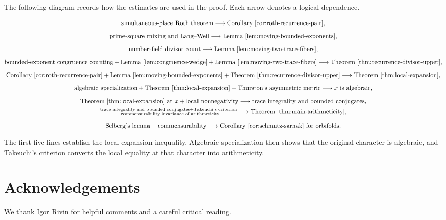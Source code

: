 \documentclass[11pt,reqno]{amsart}
\theoremstyle{definition}
\theoremstyle{remark}
\begin{document}
The following diagram records how the estimates are used in the proof.
Each arrow denotes a logical dependence.
\begin{small}
\[
\begin{gathered}
 \text{simultaneous-place Roth theorem}
 \longrightarrow
 \text{Corollary~\ref{cor:roth-recurrence-pair}},\\[2mm]
 \text{prime-square mixing and Lang--Weil}
 \longrightarrow
 \text{Lemma~\ref{lem:moving-bounded-exponents}},\\[2mm]
 \text{number-field divisor count}
 \longrightarrow
 \text{Lemma~\ref{lem:moving-two-trace-fibers}},\\[2mm]
 \text{bounded-exponent congruence counting}+
 \text{Lemma~\ref{lem:congruence-wedge}}+
 \text{Lemma~\ref{lem:moving-two-trace-fibers}}
 \longrightarrow
 \text{Theorem~\ref{thm:recurrence-divisor-upper}},\\[2mm]
 \text{Corollary~\ref{cor:roth-recurrence-pair}}+
 \text{Lemma~\ref{lem:moving-bounded-exponents}}+
 \text{Theorem~\ref{thm:recurrence-divisor-upper}}
 \longrightarrow
 \text{Theorem~\ref{thm:local-expansion}},\\[2mm]
 \text{algebraic specialization}+
 \text{Theorem~\ref{thm:local-expansion}}+
 \text{Thurston's asymmetric metric}
 \longrightarrow
 \text{\(x\) is algebraic},\\[2mm]
 \text{Theorem~\ref{thm:local-expansion} at \(x\)}+
 \text{local nonnegativity}
 \longrightarrow
 \text{trace integrality and bounded conjugates},\\
 \substack{
   \text{trace integrality and bounded conjugates}+
   \text{Takeuchi's criterion}\\
   {}+\text{commensurability invariance of arithmeticity}}
 \longrightarrow
 \text{Theorem~\ref{thm:main-arithmeticity}},\\[2mm]
 \text{Selberg's lemma}+\text{commensurability}
 \longrightarrow
 \text{Corollary~\ref{cor:schmutz-sarnak} for orbifolds}.
\end{gathered}
\]
\end{small}
The first five lines establish the local expansion inequality.  Algebraic
specialization then shows that the original character is algebraic, and
Takeuchi's criterion converts the local equality at that character into
arithmeticity.

\section*{Acknowledgements}

We thank Igor Rivin for helpful comments and a careful critical reading.



\end{document}
